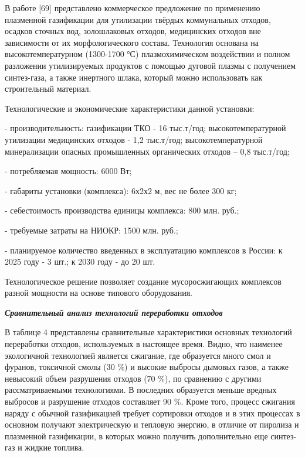 \begin{multicols}{2}
В работе {[}69{]} представлено коммерческое предложение по применению
плазменной газификации для утилизации твёрдых коммунальных отходов,
осадков сточных вод, золошлаковых отходов, медицинских отходов вне
зависимости от их морфологического состава. Технология основана на
высокотемпературном (1300-1700 °С) плазмохимическом воздействии и полном
разложении утилизируемых продуктов с помощью дуговой плазмы с получением
синтез-газа, а также инертного шлака, который можно использовать как
строительный материал.

Технологические и экономические характеристики данной установки:

- производительность: газификации ТКО - 16 тыс.т/год;
высокотемпературной утилизации медицинских отходов - 1,2 тыс.т/год;
высокотемпературной минерализации опасных промышленных органических
отходов -- 0,8 тыс.т/год;

- потребляемая мощность: 6000 Вт;

- габариты установки (комплекса): 6х2х2 м, вес не более 300 кг;

- себестоимость производства единицы комплекса: 800 млн. руб.;

- требуемые затраты на НИОКР: 1500 млн. руб.;

- планируемое количество введенных в эксплуатацию комплексов в России: к
2025 году - 3 шт.; к 2030 году - до 20 шт.

Технологическое решение позволяет создание мусоросжигающих комплексов
разной мощности на основе типового оборудования.

\emph{{\bfseries Сравнительный анализ технологий переработки отходов}}

В таблице 4 представлены сравнительные характеристики основных
технологий переработки отходов, используемых в настоящее время. Видно,
что наименее экологичной технологией является сжигание, где образуется
много смол и фуранов, токсичной смолы (30 \%) и высокие выбросы дымовых
газов, а также невысокий объем разрушения отходов (70 \%), по сравнению
с другими рассматриваемыми технологиями. В последних образуется меньше
вредных выбросов и разрушение отходов составляет 90 \%. Кроме того,
процесс сжигания наряду с обычной газификацией требует сортировки
отходов и в этих процессах в основном получают электрическую и тепловую
энергию, в отличие от пиролиза и плазменной газификации, в которых можно
получить дополнительно еще синтез-газ и жидкие топлива.
\end{multicols}

